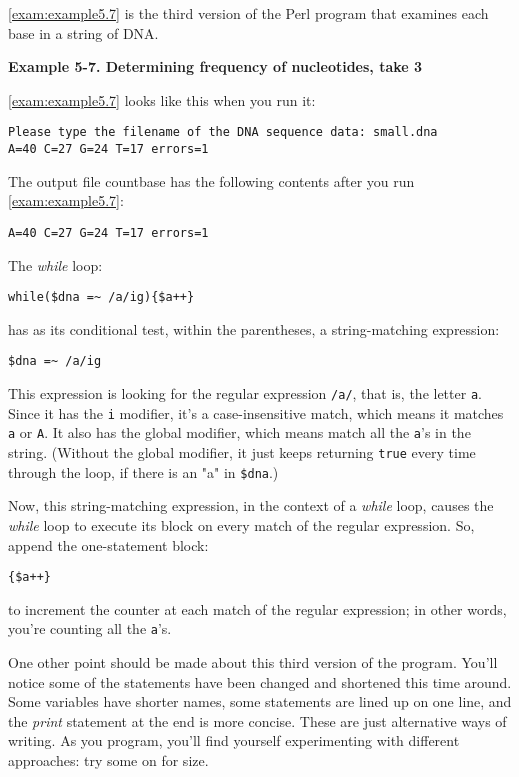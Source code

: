 \autoref{exam:example5.7} is the third version of the Perl program that examines each base in a string of DNA. 

\textbf{Example 5-7. Determining frequency of nucleotides, take 3}


\autoref{exam:example5.7} looks like this when you run it:

\begin{lstlisting}
Please type the filename of the DNA sequence data: small.dna
A=40 C=27 G=24 T=17 errors=1
\end{lstlisting}

The output file countbase has the following contents after you run \autoref{exam:example5.7}:

\begin{lstlisting}
A=40 C=27 G=24 T=17 errors=1
\end{lstlisting}

The \textit{while} loop:

\begin{lstlisting}
while($dna =~ /a/ig){$a++} 
\end{lstlisting}

has as its conditional test, within the parentheses, a string-matching expression:

\begin{lstlisting}
$dna =~ /a/ig 
\end{lstlisting}

This expression is looking for the regular expression \verb|/a/|, that is, the letter \verb|a|. Since it has the \verb|i| modifier, it's a case-insensitive match, which means it matches \verb|a| or \verb|A|. It also has the global modifier, which means match all the \verb|a|'s in the string. (Without the global modifier, it just keeps returning \verb|true| every time through the loop, if there is an "a" in \verb|$dna|.)

Now, this string-matching expression, in the context of a \textit{while} loop, causes the \textit{while} loop to execute its block on every match of the regular expression. So, append the one-statement block:

\begin{lstlisting}
{$a++}
\end{lstlisting}

to increment the counter at each match of the regular expression; in other words, you're counting all the \verb|a|'s. 

One other point should be made about this third version of the program.  You'll notice some of the statements have been changed and shortened this time around. Some variables have shorter names, some statements are lined up on one line, and the \textit{print} statement at the end is more concise. These are just alternative ways of writing. As you program, you'll find yourself experimenting with different approaches: try some on for size.

